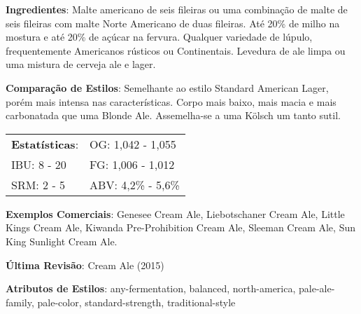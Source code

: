 \textbf{Ingredientes}: Malte americano de seis fileiras ou uma combinação de malte de seis fileiras com malte Norte Americano de duas fileiras. Até 20\% de milho na mostura e até 20\% de açúcar na fervura. Qualquer variedade de lúpulo, frequentemente Americanos rústicos ou Continentais. Levedura de ale limpa ou uma mistura de cerveja ale e lager.

\textbf{Comparação de Estilos}: Semelhante ao estilo Standard American Lager, porém mais intensa nas características. Corpo mais baixo, mais macia e mais carbonatada que uma Blonde Ale. Assemelha-se a uma Kölsch um tanto sutil.

\begin{tabular}{@{}p{35mm}p{35mm}@{}}
  \textbf{Estatísticas}: & OG: 1,042 - 1,055 \\
  IBU: 8 - 20  & FG: 1,006 - 1,012 \\
  SRM: 2 - 5  & ABV: 4,2\% - 5,6\%
\end{tabular}

\textbf{Exemplos Comerciais}: Genesee Cream Ale, Liebotschaner Cream Ale, Little Kings Cream Ale, Kiwanda Pre-Prohibition Cream Ale, Sleeman Cream Ale, Sun King Sunlight Cream Ale.

\textbf{Última Revisão}: Cream Ale (2015)

\textbf{Atributos de Estilos}: any-fermentation, balanced, north-america, pale-ale-family, pale-color, standard-strength, traditional-style

